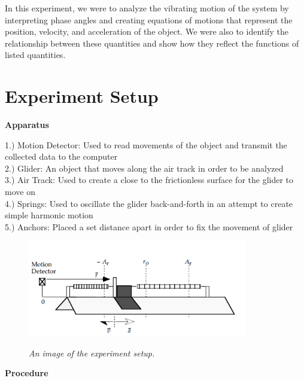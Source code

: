 \documentclass{article}
\begin{document}
In this experiment, we were to analyze the vibrating motion of the system by interpreting phase angles and creating equations of motions that represent the position, velocity, and acceleration of the object. We were also to identify the relationship between these quantities and show how they reflect the functions of listed quantities. 

\section{Experiment Setup}
\begin{center}
\large\textbf{Apparatus}
\end{center}

1.)	Motion Detector: Used to read movements of the object and transmit the collected data to the computer\\2.)	Glider: An object that moves along the air track in order to be analyzed\\3.)	Air Track: Used to create a close to the frictionless surface for the glider to move on\\4.)	Springs: Used to oscillate the glider back-and-forth in an attempt to create simple harmonic motion\\5.) Anchors: Placed a set distance apart in order to fix the movement of glider\\
\begin{figure}[h!]
\centering
\includegraphics[height=4.2cm]{Figures/figure2.png} \\
\caption{\textit{An image of the experiment setup.}}
\label{fig:air track}
\end{figure}

\begin{center}
\large\textbf{Procedure}
\end{center}
\end{document}
